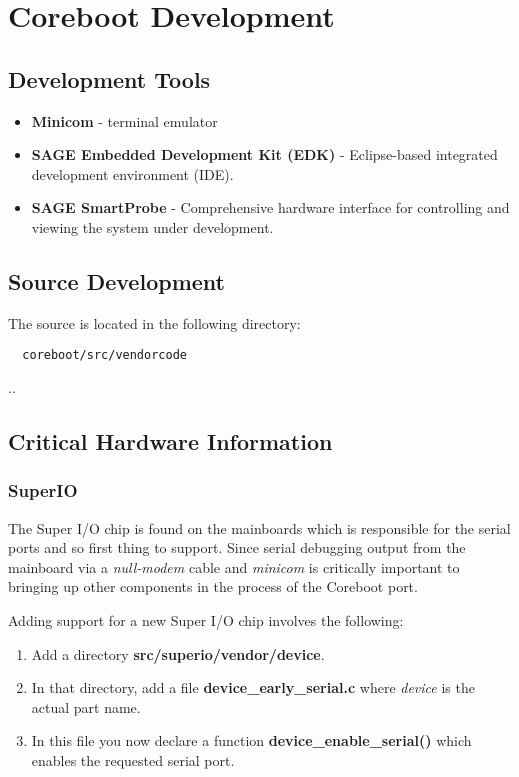 \section{Coreboot Development}

\subsection{Development Tools}

\begin{itemize}
  \item \textbf{Minicom} - terminal emulator
  \item \textbf{SAGE Embedded Development Kit (EDK)} - Eclipse-based integrated
  development environment (IDE).
  \item \textbf{SAGE SmartProbe} - Comprehensive hardware interface for
  controlling and viewing the system under development.
\end{itemize}

\subsection{Source Development}

The source is located in the following directory:

\begin{verbatim}
  coreboot/src/vendorcode
\end{verbatim}

..

\subsection{Critical Hardware Information}

\subsubsection{SuperIO}

The Super I/O chip is found on the mainboards which is responsible for the
serial ports and so first thing to support. Since serial debugging output from
the mainboard via a \emph{null-modem} cable and \emph{minicom} is critically
important to bringing up other components in the process of the Coreboot port.

Adding support for a new Super I/O chip involves the following:

\begin{enumerate}
  \item Add a directory \textbf{src/superio/vendor/device}.
  \item In that directory, add a file \textbf{device\_early\_serial.c} where
  \emph{device} is the actual part name.
  \item In this file you now declare a function
  \textbf{device\_enable\_serial()} which enables the requested serial port.
\end{enumerate}

